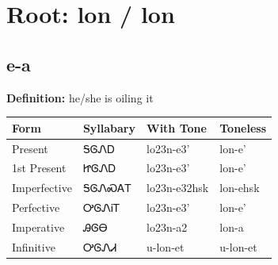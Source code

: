\documentclass{article}%
\begin{document}
%
\normalsize%
\section*{Root: lon / lon}%
\subsection*{e-a}%
\textbf{Definition: }%
he/she is oiling it%
\\[0.5em]%
\begin{tabular}{|l|l|l|l|}%
\hline%
\textbf{Form}&\textbf{Syllabary}&\textbf{With Tone}&\textbf{Toneless}\\%
\hline%
Present&ᎦᎶᏁᎠ&lo23n{-}e3'&lon{-}e'\\%
1st Present&ᏥᎶᏁᎠ&lo23n{-}e3'&lon{-}e'\\%
Imperfective&ᎦᎶᏁᏍᎪᎢ&lo23n{-}e32hsk&lon{-}ehsk\\%
Perfective&ᎤᎶᏁᎥᎢ&lo23n{-}e3'&lon{-}e'\\%
Imperative&ᎯᎶᎾ&lo23n{-}a2&lon{-}a\\%
Infinitive&ᎤᎶᏁᏗ&u{-}lon{-}et&u{-}lon{-}et\\%
\hline%
\end{tabular}%
\\[1em]%
\end{document}
